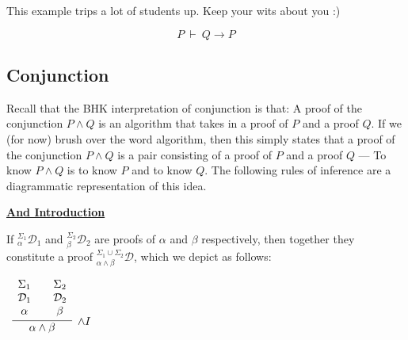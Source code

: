 \documentclass{book}
\begin{document}
    \begin{eg} [S Combinator]
        
    \end{eg}

    \begin{eg} [K Combinator]
        
        This example trips a lot of students up. Keep your wits about you :)

        $$P \ \vdash \ Q \to P$$

    \end{eg}

    \newpage
    \subsection{Conjunction}

    Recall that the BHK interpretation of conjunction is that: A proof of the conjunction $P \land Q$ is an algorithm that takes in a proof of $P$ and a proof $Q$. If we (for now) brush over the word algorithm, then this simply states that a proof of the conjunction $P \land Q$ is a pair consisting of a proof of $P$ and a proof $Q$ --- To know $P \land Q$ is to know $P$ and to know $Q$. The following rules of inference are a diagrammatic representation of this idea. 

    \vspace{0.1cm}

    \begin{mdframed}

        \underline{{\bf And Introduction}}

        If $^{\Sigma_{1}}_{\alpha}\mathcal{D}_{1}$ and $^{\Sigma_{2}}_{\beta}\mathcal{D}_{2}$ are proofs of $\alpha$ and $\beta$ respectively, then together they constitute a proof $^{\Sigma_{1} \cup \Sigma_{2}}_{\alpha \land \beta}\mathcal{D}$, which we depict as follows: 

        \begin{center}
            $\begin{array}{c}
                \infer[\land I]{\alpha \land \beta}
                    {\begin{array}{c}
                        \Sigma_{1} \\
                        \mathcal{D}_{1} \\
                        \alpha
                    \end{array}
                    &
                    \begin{array}{c}
                        \Sigma_{2} \\
                        \mathcal{D}_{2} \\
                        \beta
                    \end{array}}
            \end{array}$
        \end{center}
    \end{mdframed}
\end{document}
